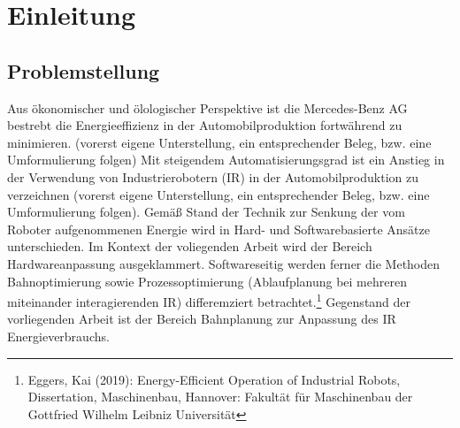 \chapter{Einleitung}
\label{cha:Einleitung}

\section{Problemstellung}
Aus ökonomischer und ölologischer Perspektive ist die Mercedes-Benz AG  bestrebt die Energieeffizienz in der Automobilproduktion fortwährend zu minimieren. (vorerst eigene Unterstellung, ein entsprechender Beleg, bzw. eine Umformulierung folgen) Mit steigendem Automatisierungsgrad ist ein Anstieg in der Verwendung von Industrierobotern (IR) in der Automobilproduktion zu verzeichnen (vorerst eigene Unterstellung, ein entsprechender Beleg, bzw. eine Umformulierung folgen). Gemäß Stand der Technik zur Senkung der vom Roboter aufgenommenen Energie wird in Hard- und Softwarebasierte Ansätze unterschieden. Im Kontext der voliegenden Arbeit wird der Bereich Hardwareanpassung ausgeklammert. Softwareseitig werden ferner die Methoden Bahnoptimierung sowie Prozessoptimierung (Ablaufplanung bei mehreren miteinander interagierenden IR) differemziert betrachtet.\footnote{Eggers, Kai (2019): Energy-Efficient Operation of Industrial Robots, Dissertation, Maschinenbau, Hannover: Fakultät für Maschinenbau der Gottfried Wilhelm Leibniz Universität} Gegenstand der vorliegenden Arbeit ist der Bereich Bahnplanung zur Anpassung des IR Energieverbrauchs.
